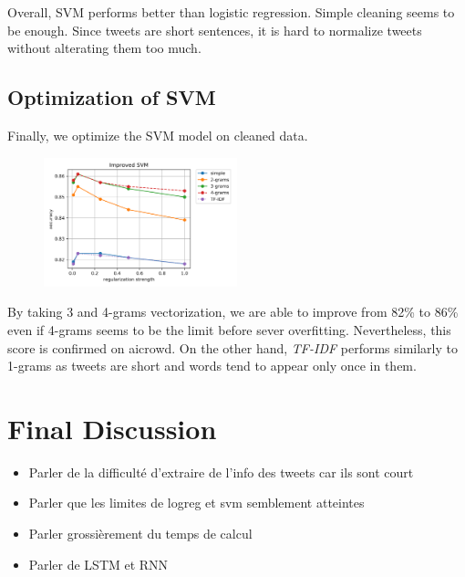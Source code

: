 \documentclass[11pt, a4paper, twocolumn]{article}
\begin{document}
Overall, SVM performs better than logistic regression. Simple cleaning seems to be enough. Since tweets are short sentences, it is hard to normalize tweets without alterating them too much.

\subsection{Optimization of SVM}
Finally, we optimize the SVM model on cleaned data.

\begin{figure}[h]
	\includegraphics[width=0.5\textwidth]{../plots/improved_svm.png}
\end{figure}

By taking 3 and 4-grams vectorization, we are able to improve from 82\% to 86\% even if 4-grams seems to be the limit before sever overfitting. Nevertheless, this score is confirmed on aicrowd. On the other hand, \textit{TF-IDF} performs similarly to 1-grams as tweets are short and words tend to appear only once in them.

\section{Final Discussion}
\begin{itemize}
	\item Parler de la difficulté d'extraire de l'info des tweets car ils sont court
	\item Parler que les limites de logreg et svm semblement atteintes
	\item Parler grossièrement du temps de calcul
	\item Parler de LSTM et RNN
\end{itemize}

\clearpage
\onecolumn
\end{document}
